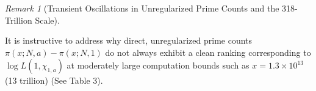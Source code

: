 \documentclass[12pt,reqno]{amsart}
\theoremstyle{definition}
\theoremstyle{remark}
\newtheorem{remark}[theorem]{Remark}
\numberwithin{equation}{section}
\begin{document}
\begin{remark}[Transient Oscillations in Unregularized Prime Counts and the 318-Trillion Scale]\label{rem:transient_behavior}


It is instructive to address why direct, unregularized prime counts $\pi(x; N, a) - \pi(x; N, 1)$ do not always exhibit a clean ranking corresponding to $\log L(1, \chi_{1,a})$ at moderately large computation bounds such as $x = 1.3 \times 10^{13}$ (13 trillion) (See Table 3).


\begin{table}[htbp]
\centering
\caption{Comparison of prime count differences $\pi(x;N,a)-\pi(x;N,1)$.}
\label{tab:raw_prime_counts}


\end{table}
\end{remark}
\end{document}
